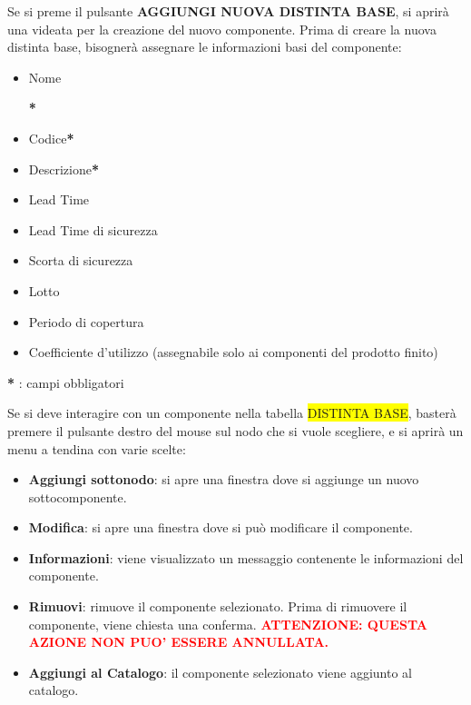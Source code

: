 \documentclass[12pt,twoside]{report}
\newcommand{\coloredbold}[2]{\textcolor{#1}{\textbf{#2}}}
\begin{document}
Se si preme il pulsante \textbf{AGGIUNGI NUOVA DISTINTA BASE}, si aprirà una videata per la creazione del nuovo componente.
Prima di creare la nuova distinta base, bisognerà assegnare le informazioni basi del componente:

\begin{itemize}
	
	\item \hypertarget{CompDistintaBase}{Nome}\textbf{*} 
	\item Codice\textbf{*} 
	\item Descrizione\textbf{*} 
	\item Lead Time
	\item Lead Time di sicurezza
	\item Scorta di sicurezza
	\item Lotto
	\item Periodo di copertura 
	\item Coefficiente d’utilizzo (assegnabile solo ai componenti del prodotto finito)  
	      	      
\end{itemize}

\begin{flushright}
	
	\textbf{*}   : campi obbligatori
	
\end{flushright}

Se si deve interagire con un componente nella tabella \colorbox{yellow}{DISTINTA BASE}, basterà premere il pulsante destro del mouse sul nodo che si vuole scegliere, e si aprirà un menu a tendina con varie scelte:

\begin{itemize}
	\item \textbf{Aggiungi sottonodo}: si apre una finestra dove si aggiunge un nuovo sottocomponente.
	\item \textbf{Modifica}: si apre una finestra dove si può modificare il componente.
	\item \textbf{Informazioni}: viene visualizzato un messaggio contenente le informazioni del componente.
	\item \textbf{Rimuovi}: rimuove il componente selezionato. Prima di rimuovere il componente, viene chiesta una conferma. \coloredbold{red}{ATTENZIONE: QUESTA AZIONE NON PUO’ ESSERE ANNULLATA.}
	\item \textbf{Aggiungi al Catalogo}: il componente selezionato viene aggiunto al catalogo. 
	      	          
\end{itemize}
\end{document}
